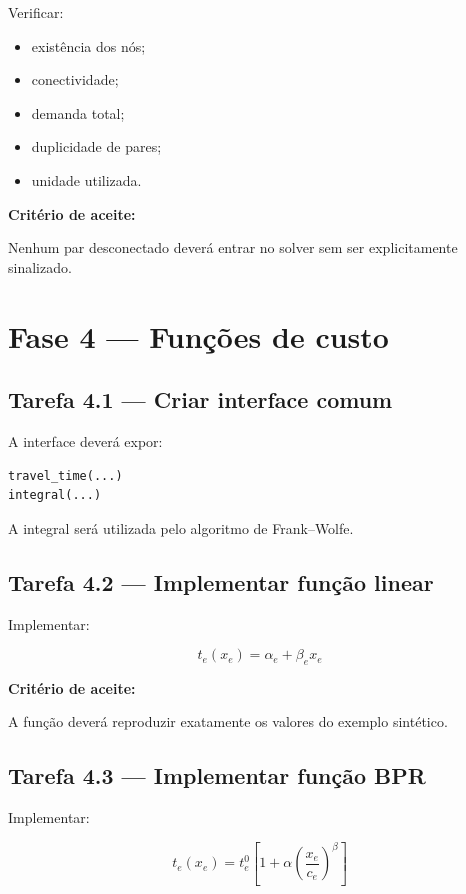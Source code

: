 \documentclass[12pt,a4paper]{article}
\begin{document}
Verificar:

\begin{itemize}
    \item existência dos nós;
    \item conectividade;
    \item demanda total;
    \item duplicidade de pares;
    \item unidade utilizada.
\end{itemize}

\textbf{Critério de aceite:}

Nenhum par desconectado deverá entrar no solver sem ser explicitamente
sinalizado.

\section{Fase 4 --- Funções de custo}

\subsection{Tarefa 4.1 --- Criar interface comum}

A interface deverá expor:

\begin{verbatim}
travel_time(...)
integral(...)
\end{verbatim}

A integral será utilizada pelo algoritmo de Frank--Wolfe.

\subsection{Tarefa 4.2 --- Implementar função linear}

Implementar:

\begin{equation}
    t_e(x_e) = \alpha_e + \beta_e x_e
\end{equation}

\textbf{Critério de aceite:}

A função deverá reproduzir exatamente os valores do exemplo sintético.

\subsection{Tarefa 4.3 --- Implementar função BPR}

Implementar:

\begin{equation}
    t_e(x_e)
    =
    t_e^0
    \left[
        1 +
        \alpha
        \left(
            \frac{x_e}{c_e}
        \right)^\beta
    \right]
\end{equation}
\end{document}

